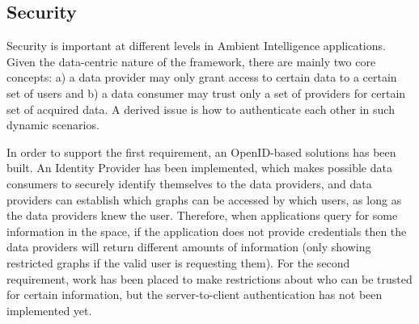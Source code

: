\subsection{Security} %

Security is important at different levels in Ambient Intelligence applications. Given the data-centric nature of the
framework, there are mainly two core concepts: a) a data provider may only grant access to certain data to a certain set
of users and b) a data consumer may trust only a set of providers for certain set of acquired data. A derived issue is
how to authenticate each other in such dynamic scenarios.

In order to support the first requirement, an OpenID-based solutions has been built. An Identity Provider has been
implemented, which makes possible data consumers to securely identify themselves to the data providers, and data
providers can establish which graphs can be accessed by which users, as long as the data providers knew the user.
Therefore, when applications query for some information in the space, if the application does not provide credentials
then the data providers will return different amounts of information (only showing restricted graphs if the valid user
is requesting them). For the second requirement, work has been placed to make restrictions about who can be trusted for
certain information, but the server-to-client authentication has not been implemented yet.

% 
% 
%
% 
